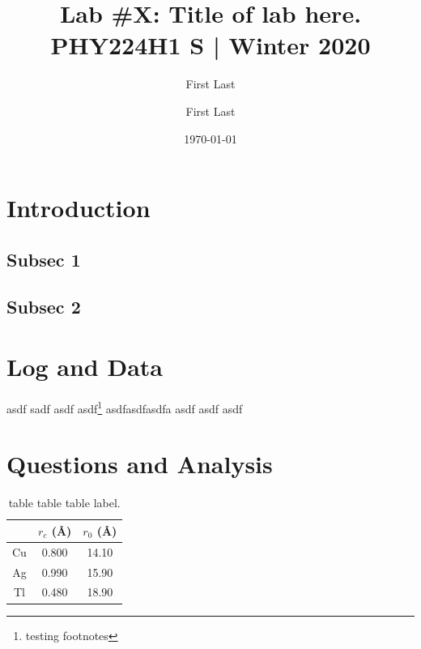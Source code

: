 \documentclass[11pt,twocolumn]{article}
\title{\vspace{-1cm}Lab \#X: Title of lab here. \\[0.4cm]\large{PHY224H1 S | Winter 2020}\vspace{-0.5em}}
\author{First Last \and First Last}
\date{\vspace{-0.3em}\normalsize\today}
\begin{document}

\section{Introduction}
\lipsum[1-1]

\subsection{Subsec 1}
\lipsum[2-3]

\subsection{Subsec 2}
\lipsum[3-5]

\section{Log and Data}
asdf sadf asdf asdf\hspace{0.2em}\footnote{\hspace{0.7em}testing footnotes} asdfasdfasdfa asdf asdf asdf 

\section{Questions and Analysis}
\lipsum[1-5]


\begin{table}[htb]
    \caption{\label{tab:table1}table table table label.}
    \vspace{1em}\hline\hline\vspace{0.3em}\centering
    \begin{tabular}{ccc}
        &$r_c$ (\AA)&$r_0$ (\AA)\\
        \hline
        Cu& 0.800 & 14.10\\
        Ag& 0.990 & 15.90\\
        Tl& 0.480 & 18.90\\
    \end{tabular}
    \hline\hline
\end{table}
\end{document}
